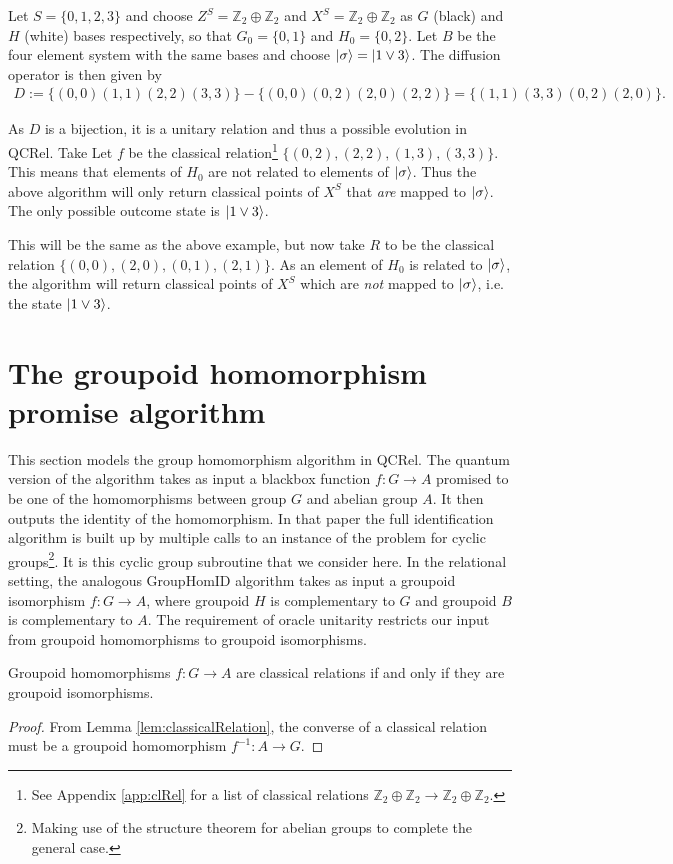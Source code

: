 \begin{example}
Let $S=\{0,1,2,3\}$ and choose $Z^S=\mathbb{Z}_2\oplus\mathbb{Z}_2$ and $X^S=\mathbb{Z}_2\oplus\mathbb{Z}_2$ as $G$ (black) and $H$ (white) bases respectively, so that $G_0=\{0,1\}$ and $H_0 = \{0,2\}$. Let $B$ be the four element system with the same bases and choose $| \sigma \rangle=| 1\vee3 \rangle$. The diffusion operator is then given by
\begin{align*}
D := \{(0,0)(1,1)(2,2)(3,3)\}-\{(0,0)(0,2)(2,0)(2,2)\}=\{(1,1)(3,3)(0,2)(2,0)\}.
\end{align*}

As $D$ is a bijection, it is a unitary relation and thus a possible evolution in QCRel.  Take Let $f$ be the classical relation\footnote{See Appendix \ref{app:clRel} for a list of classical relations $\mathbb{Z}_2\oplus\mathbb{Z}_2\to\mathbb{Z}_2\oplus\mathbb{Z}_2$.} $\{(0,2),(2,2),(1,3),(3,3)\}$.  This means that elements of $H_0$ are not related to elements of $| \sigma \rangle$. Thus the above algorithm will only return classical points of $X^{S}$ that \textit{are} mapped to $| \sigma \rangle$.  The only possible outcome state is $| 1\vee 3 \rangle$.
\end{example}

\begin{example}
This will be the same as the above example, but now take $R$ to be the classical relation $\{(0,0),(2,0),(0,1),(2,1)\}$. As an element of $H_0$ is related to $| \sigma \rangle$, the algorithm will return classical points of $X^S$ which are \emph{not} mapped to $| \sigma \rangle$, i.e. the state $| 1\vee3 \rangle$.
\end{example}

\section{The groupoid homomorphism promise algorithm}

This section models the group homomorphism algorithm  in QCRel.  The quantum version of the algorithm takes as input a blackbox function $f:G\to A$ promised to be one of the homomorphisms between group $G$ and abelian group $A$.  It then outputs the identity of the homomorphism. In that paper the full identification algorithm is built up by multiple calls to an instance of the problem for cyclic groups\footnote{Making use of the structure theorem for abelian groups to complete the general case.}. It is this cyclic group subroutine that we consider here. In the relational setting, the analogous GroupHomID algorithm takes as input a groupoid isomorphism $f:G\to A$, where groupoid $H$ is complementary to $G$ and groupoid $B$ is complementary to $A$.  The requirement of oracle unitarity restricts our input from groupoid homomorphisms to groupoid isomorphisms.
\begin{corollary}
Groupoid homomorphisms $f:G\to A$ are classical relations if and only if they are groupoid isomorphisms.
\end{corollary}
\begin{proof}
From Lemma \ref{lem:classicalRelation}, the converse of a classical relation must be a groupoid homomorphism $f^{-1}:A\to G$.
\end{proof}

